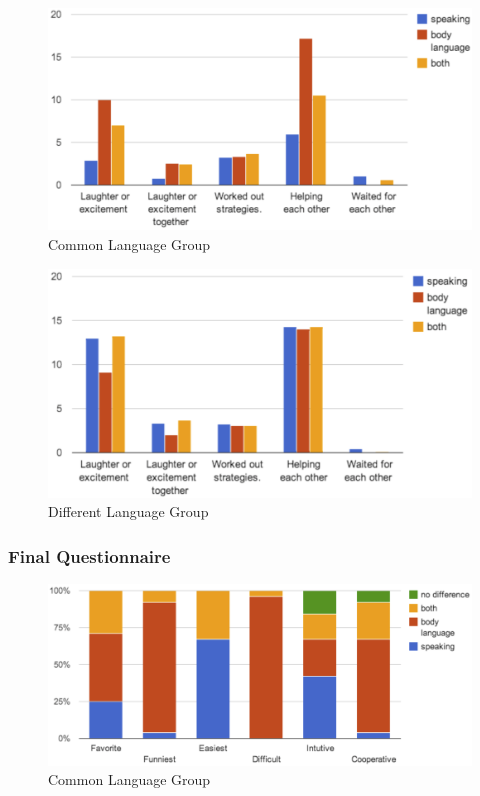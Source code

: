 \begin{figure}[!h]
\centering
\includegraphics[width=0.9\columnwidth]{Figures/US_CPMs_Com.png}
\caption{Common Language Group}
\label{fig:US_CPMs_Com}
\end{figure}

\begin{figure}[!h]
\centering
\includegraphics[width=0.9\columnwidth]{Figures/US_CPMs_Dif.png}
\caption{Different Language Group}
\label{fig:US_CPMs_Dif}
\end{figure}


\subsubsection{Final Questionnaire}

\begin{figure}[!h]
\centering
\includegraphics[width=0.9\columnwidth]{Figures/US_FQ_Com.png}
\caption{Common Language Group}
\label{fig:US_FQ_Com}
\end{figure}

